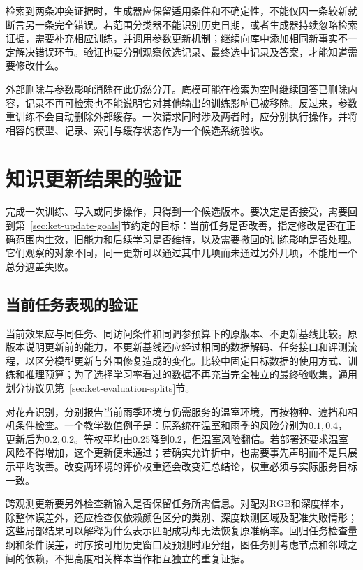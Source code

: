 检索到两条冲突证据时，生成器应保留适用条件和不确定性，不能仅因一条较新就断言另一条完全错误。若范围分类器不能识别历史日期，或者生成器持续忽略检索证据，需要补充相应训练，并调用参数更新机制；继续向库中添加相同新事实不一定解决错误环节。验证也要分别观察候选记录、最终选中记录及答案，才能知道需要修改什么。

外部删除与参数影响消除在此仍然分开。底模可能在检索为空时继续回答已删除内容，记录不再可检索也不能说明它对其他输出的训练影响已被移除。反过来，参数重训练不会自动删除外部缓存。一次请求同时涉及两者时，应分别执行操作，并将相容的模型、记录、索引与缓存状态作为一个候选系统验收。

\section{知识更新结果的验证}
\label{sec:ket-update-validation}

完成一次训练、写入或同步操作，只得到一个候选版本。要决定是否接受，需要回到第~\ref{sec:ket-update-goals}节约定的目标：当前任务是否改善，指定修改是否在正确范围内生效，旧能力和后续学习是否维持，以及需要撤回的训练影响是否处理。它们观察的对象不同，同一更新可以通过其中几项而未通过另外几项，不能用一个总分遮盖失败。

\subsection{当前任务表现的验证}
\label{sec:ket-update-current-validation}

当前效果应与同任务、同访问条件和同调参预算下的原版本、不更新基线比较。原版本说明更新前的能力，不更新基线还应经过相同的数据解码、任务接口和评测流程，以区分模型更新与外围修复造成的变化。比较中固定目标数据的使用方式、训练和推理预算；为了选择学习率看过的数据不再充当完全独立的最终验收集，通用划分协议见第~\ref{sec:ket-evaluation-splits}节。

对花卉识别，分别报告当前雨季环境与仍需服务的温室环境，再按物种、遮挡和相机条件检查。一个教学数值例子是：原系统在温室和雨季的风险分别为$0.1,0.4$，更新后为$0.2,0.2$。等权平均由$0.25$降到$0.2$，但温室风险翻倍。若部署还要求温室风险不得增加，这个更新便未通过；若确实允许折中，也需要事先声明而不是只展示平均改善。改变两环境的评价权重还会改变汇总结论，权重必须与实际服务目标一致。

跨观测更新要另外检查新输入是否保留任务所需信息。对配对RGB和深度样本，除整体误差外，还应检查仅依赖颜色区分的类别、深度缺测区域及配准失败情形；这些局部结果可以解释为什么表示匹配成功却无法恢复原准确率。回归任务检查量纲和条件误差，时序按可用历史窗口及预测时距分组，图任务则考虑节点和邻域之间的依赖，不把高度相关样本当作相互独立的重复证据。

